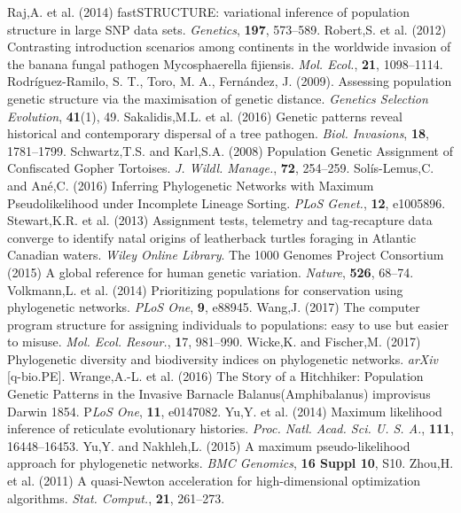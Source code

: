 \documentclass[final]{bioinfo}
\begin{document}
\begin{thebibliography}{}
\bibitem[a ()]{}Raj,A. et al. (2014) fastSTRUCTURE: variational inference of population structure in large SNP data sets. \textit{Genetics}, \textbf{197}, 573–589.
\bibitem[a ()]{}Robert,S. et al. (2012) Contrasting introduction scenarios among continents in the worldwide invasion of the banana fungal pathogen Mycosphaerella fijiensis. \textit{Mol. Ecol.}, \textbf{21}, 1098–1114.
\bibitem[a ()]{}Rodríguez-Ramilo, S. T., Toro, M. A., Fernández, J. (2009). Assessing population genetic structure via the maximisation of genetic distance. \textit{Genetics Selection Evolution}, \textbf{41}(1), 49.
\bibitem[a ()]{}Sakalidis,M.L. et al. (2016) Genetic patterns reveal historical and contemporary dispersal of a tree pathogen. \textit{Biol. Invasions}, \textbf{18}, 1781–1799.
\bibitem[a ()]{}Schwartz,T.S. and Karl,S.A. (2008) Population Genetic Assignment of Confiscated Gopher Tortoises. \textit{J. Wildl. Manage.}, \textbf{72}, 254–259.
\bibitem[a ()]{}Solís-Lemus,C. and Ané,C. (2016) Inferring Phylogenetic Networks with Maximum Pseudolikelihood under Incomplete Lineage Sorting. \textit{PLoS Genet.}, \textbf{12}, e1005896.
\bibitem[a ()]{}Stewart,K.R. et al. (2013) Assignment tests, telemetry and tag‐recapture data converge to identify natal origins of leatherback turtles foraging in Atlantic Canadian waters. \textit{Wiley Online Library}.
\bibitem[a ()]{}The 1000 Genomes Project Consortium (2015) A global reference for human genetic variation. \textit{Nature}, \textbf{526}, 68–74.
\bibitem[a ()]{}Volkmann,L. et al. (2014) Prioritizing populations for conservation using phylogenetic networks. \textit{PLoS One}, \textbf{9}, e88945.
\bibitem[a ()]{}Wang,J. (2017) The computer program structure for assigning individuals to populations: easy to use but easier to misuse. \textit{Mol. Ecol. Resour.}, \textbf{1}7, 981–990.
\bibitem[a ()]{}Wicke,K. and Fischer,M. (2017) Phylogenetic diversity and biodiversity indices on phylogenetic networks. \textit{arXiv }[q-bio.PE].
\bibitem[a ()]{}Wrange,A.-L. et al. (2016) The Story of a Hitchhiker: Population Genetic Patterns in the Invasive Barnacle Balanus(Amphibalanus) improvisus Darwin 1854. P\textit{LoS One}, \textbf{11}, e0147082.
\bibitem[a ()]{}Yu,Y. et al. (2014) Maximum likelihood inference of reticulate evolutionary histories. \textit{Proc. Natl. Acad. Sci. U. S. A.}, \textbf{111}, 16448–16453.
\bibitem[a ()]{}Yu,Y. and Nakhleh,L. (2015) A maximum pseudo-likelihood approach for phylogenetic networks. \textit{BMC Genomics}, \textbf{16 Suppl 10}, S10.
\bibitem[a ()]{}Zhou,H. et al. (2011) A quasi-Newton acceleration for high-dimensional optimization algorithms. \textit{Stat. Comput.}, \textbf{21}, 261–273.

\end{thebibliography}
\end{document}

